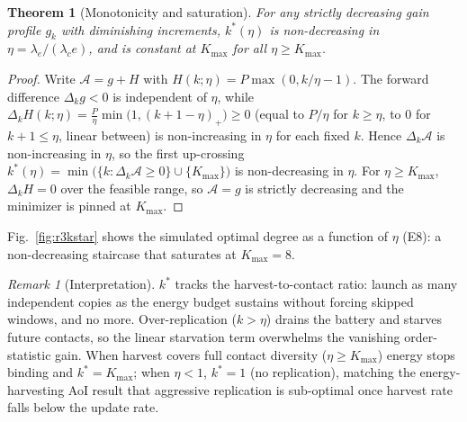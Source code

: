 \documentclass[twocolumn,3p,times,procedia]{elsarticle}
\theoremstyle{plain}
\newtheorem{theorem}{Theorem}
\theoremstyle{remark}
\newtheorem{remark}{Remark}
\newcommand{\kstar}{k^{\ast}}
\begin{document}
\begin{theorem}[Monotonicity and saturation]\label{thm:r3}
For any strictly decreasing gain profile $g_k$ with diminishing
increments, $\kstar(\eta)$ is non-decreasing in
$\eta=\lambda_e/(\lambda_c e)$, and is
constant at $K_{\max}$ for all $\eta\ge K_{\max}$.
\end{theorem}
\begin{proof}
Write $\mathcal{A}=g+H$ with
$H(k;\eta)=P\max(0,k/\eta-1)$. The forward difference $\Delta_k g<0$ is
independent of $\eta$, while
$\Delta_k H(k;\eta)=\tfrac{P}{\eta}\min\bigl(1,(k{+}1-\eta)_+\bigr)\ge0$
(equal to $P/\eta$ for $k\ge\eta$, to $0$ for $k{+}1\le\eta$, linear
between) is non-increasing in $\eta$ for each fixed $k$. Hence
$\Delta_k\mathcal{A}$ is non-increasing in $\eta$, so the first
up-crossing $\kstar(\eta)=\min\bigl(\{k:\Delta_k\mathcal{A}\ge0\}
\cup\{K_{\max}\}\bigr)$ is
non-decreasing in $\eta$. For $\eta\ge K_{\max}$, $\Delta_k H=0$ over the
feasible range, so $\mathcal{A}=g$ is strictly decreasing and the
minimizer is pinned at $K_{\max}$.
\end{proof}
Fig.~\ref{fig:r3kstar} shows the simulated optimal degree as a function
of $\eta$ (E8): a non-decreasing staircase that saturates at
$K_{\max}{=}8$.




\begin{remark}[Interpretation]
$\kstar$ tracks the harvest-to-contact ratio: launch as many independent
copies as the energy budget sustains without forcing skipped windows, and
no more. Over-replication ($k>\eta$) drains the battery and starves
future contacts, so the linear starvation term overwhelms the vanishing
order-statistic gain. When harvest covers full contact diversity
($\eta\ge K_{\max}$) energy stops binding and $\kstar=K_{\max}$; when
$\eta<1$, $\kstar=1$ (no replication), matching the energy-harvesting AoI
result that aggressive replication is sub-optimal once harvest rate falls
below the update rate.
\end{remark}
\end{document}
